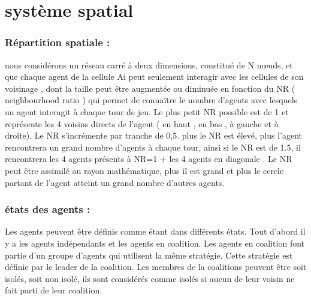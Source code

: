 \documentclass[30pt]{report}
\begin{document}
\part{système spatial}
\section{Répartition spatiale :}
	nous considérons un réseau carré à deux dimensions, constitué de N nœuds, et que chaque agent de la cellule Ai peut seulement interagir avec les cellules de son voisinage , dont la taille peut être augmentée ou diminuée en fonction du NR ( neighbourhood ratio ) qui permet de connaître le nombre d'agents avec lesquels un agent interagit à chaque tour de jeu. 
	\newline
	\newline
	Le plus petit NR possible est de 1 et représente les 4 voisins directs de l'agent ( en haut , en bas , à gauche et à droite). 
	\newline
	\newline
	Le NR s'incrémente par tranche de 0,5. plus le NR est élevé, plus l'agent rencontrera un grand nombre d'agents à chaque tour, ainsi si le NR est de 1.5, il rencontrera les 4 agents présents à NR=1 + les 4 agents en diagonale . 
	\newline
	\newline
	Le NR peut être assimilé au rayon mathématique, plus il est grand et plus le cercle partant de l'agent atteint un grand nombre d'autres agents.
	\newline
\section{états des agents :}
	Les agents peuvent être définis comme étant dans différents états.
	\newline
	\newline
Tout d'abord il y a les agents indépendants et les agents en coalition.
\newline
	\newline
Les agents en coalition font partie d'un groupe d'agents qui utilisent la même stratégie. Cette stratégie est définie par le leader de la coalition.
\newline
	\newline
Les membres de la coalitions peuvent être soit isolés, soit non isolé, ils sont considérés comme isolés si aucun de leur voisin ne fait parti de leur coalition.
\newline
\end{document}
